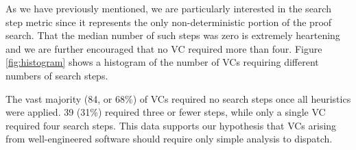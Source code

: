 As we have previously mentioned, we are particularly interested in the search step metric since it represents the only non-deterministic portion of the proof search.  That the median number of such steps was zero is extremely heartening and we are further encouraged that no VC required more than four.  Figure \ref{fig:histogram} shows a histogram of the number of VCs requiring different numbers of search steps.

The vast majority (84, or 68\%) of VCs required no search steps once all heuristics were applied.  39 (31\%) required three or fewer steps, while only a single VC required four search steps.  This data supports our hypothesis that VCs arising from well-engineered software should require only simple analysis to dispatch.
